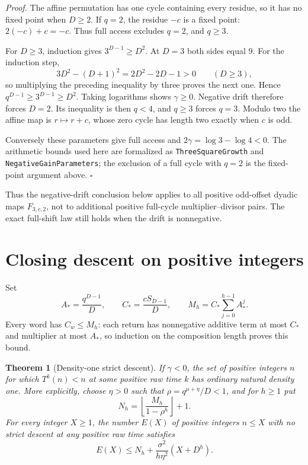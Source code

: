 \documentclass[11pt,letterpaper]{article}
\newtheorem{theorem}{Theorem}
\newenvironment{proof}{\noindent\textit{Proof.}}{\hfill\(\square\)}
\begin{document}
\begin{proof}
The affine permutation has one cycle containing every residue, so it has no fixed point when \(D\ge2\).
If \(q=2\), the residue \(-c\) is a fixed point:
\(2(-c)+c=-c\).
Thus full access excludes \(q=2\), and \(q\ge3\).

For \(D\ge3\), induction gives \(3^{D-1}\ge D^2\).
At \(D=3\) both sides equal \(9\).
For the induction step,
\[
3D^2-(D+1)^2=2D^2-2D-1>0\qquad(D\ge3),
\]
so multiplying the preceding inequality by three proves the next one.
Hence \(q^{D-1}\ge3^{D-1}\ge D^2\).
Taking logarithms shows \(\gamma\ge0\).
Negative drift therefore forces \(D=2\).
Its inequality is then \(q<4\), and \(q\ge3\) forces \(q=3\).
Modulo two the affine map is \(r\mapsto r+c\), whose zero cycle has
length two exactly when \(c\) is odd.

Conversely these parameters give full access and
\(2\gamma=\log3-\log4<0\).
The arithmetic bounds used here are formalized as
\texttt{ThreeSquareGrowth} and \texttt{NegativeGainParameters};
the exclusion of a full cycle with \(q=2\) is the fixed-point argument above.
\end{proof}

Thus the negative-drift conclusion below applies to all positive odd-offset dyadic maps \(F_{3,c,2}\), not to additional positive full-cycle multiplier--divisor pairs.
The exact full-shift law still holds when the drift is nonnegative.

\section{Closing descent on positive integers}

Set
\[
A_*=\frac{q^{D-1}}D,\qquad
C_*=\frac{cS_{D-1}}D,\qquad
M_h=C_*\sum_{j=0}^{h-1}A_*^j.
\]
Every word has \(C_w\le M_h\): each return has nonnegative additive term
at most \(C_*\) and multiplier at most \(A_*\), so induction on the
composition length proves this bound.

\begin{theorem}[Density-one strict descent]
\label{thm:descent}
If \(\gamma<0\), the set of positive integers \(n\) for which
\(T^k(n)<n\) at some positive raw time \(k\) has ordinary natural density
one.
More explicitly, choose \(\eta>0\) such that
\(\rho=q^{\mu+\eta}/D<1\), and for \(h\ge1\) put
\[
N_h=\left\lfloor\frac{M_h}{1-\rho^h}\right\rfloor+1.
\]
For every integer \(X\ge1\), the number \(E(X)\) of positive integers
\(n\le X\) with no strict descent at any positive raw time satisfies
\[
E(X)\le N_h+\frac{\sigma^2}{h\eta^2}(X+D^h).
\]
\end{theorem}
\end{document}
